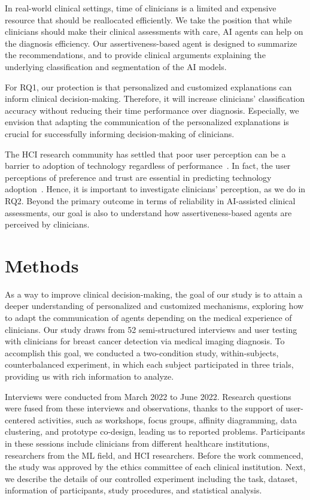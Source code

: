 In real-world clinical settings, time of clinicians is a limited and expensive resource that should be reallocated efficiently.
We take the position that while clinicians should make their clinical assessments with care, AI agents can help on the diagnosis efficiency.
Our assertiveness-based agent is designed to summarize the recommendations, and to provide clinical arguments explaining the underlying classification and segmentation of the AI models.

For RQ1, our protection is that personalized and customized explanations can inform clinical decision-making.
Therefore, it will increase clinicians' classification accuracy without reducing their time performance over diagnosis.
Especially, we envision that adapting the communication of the personalized explanations is crucial for successfully informing decision-making of clinicians.

The HCI research community has settled that poor user perception can be a barrier to adoption of technology regardless of performance~\cite{10.1145/3313831.3376506, 10.1145/3479549, 10.1145/3434073.3444649}.
In fact, the user perceptions of preference and trust are essential in predicting technology adoption~\cite{10.1145/3434073.3444649}.
Hence, it is important to investigate clinicians' perception, as we do in RQ2.
Beyond the primary outcome in terms of reliability in AI-assisted clinical assessments, our goal is also to understand how assertiveness-based agents are perceived by clinicians.

\section{Methods}
\label{sec:chap006005}

As a way to improve clinical decision-making, the goal of our study is to attain a deeper understanding of personalized and customized mechanisms, exploring how to adapt the communication of agents depending on the medical experience of clinicians.
Our study draws from 52 semi-structured interviews and user testing with clinicians for breast cancer detection via medical imaging diagnosis.
To accomplish this goal, we conducted a two-condition study, within-subjects, counterbalanced experiment, in which each subject participated in three trials, providing us with rich information to analyze.

Interviews were conducted from March 2022 to June 2022.
Research questions were fused from these interviews and observations, thanks to the support of user-centered activities, such as workshops, focus groups, affinity diagramming, data clustering, and prototype co-design, leading us to reported problems.
Participants in these sessions include clinicians from different healthcare institutions, researchers from the ML field, and HCI researchers.
Before the work commenced, the study was approved by the ethics committee of each clinical institution.
Next, we describe the details of our controlled experiment including the task, dataset, information of participants, study procedures, and statistical analysis.

